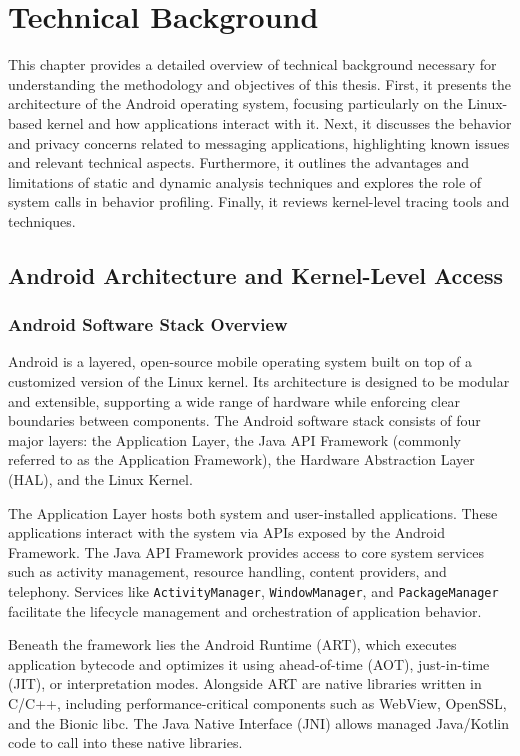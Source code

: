 \documentclass[a4paper,12pt]{report}
\begin{document}

\chapter{Technical Background}

This chapter provides a detailed overview of technical background necessary for understanding the methodology and objectives of this thesis. First, it presents the architecture of the Android operating system, focusing particularly on the Linux-based kernel and how applications interact with it. Next, it discusses the behavior and privacy concerns related to messaging applications, highlighting known issues and relevant technical aspects. Furthermore, it outlines the advantages and limitations of static and dynamic analysis techniques and explores the role of system calls in behavior profiling. Finally, it reviews kernel-level tracing tools and techniques.
\section{Android Architecture and Kernel-Level Access}

\subsection{Android Software Stack Overview}
Android is a layered, open-source mobile operating system built on top of a customized version of the
Linux kernel. Its architecture is designed to be modular and extensible, supporting a wide range of
hardware while enforcing clear boundaries between components. The Android software stack consists
of four major layers: the Application Layer, the Java API Framework (commonly referred to as the
Application Framework), the Hardware Abstraction Layer (HAL), and the Linux Kernel.

The Application Layer hosts both system and user-installed applications.
These applications interact with the system via APIs exposed by the Android Framework.
The Java API Framework provides access to core system services such as activity management,
resource handling, content providers, and telephony. Services like \texttt{ActivityManager},
\texttt{WindowManager}, and \texttt{PackageManager} facilitate the lifecycle management and
orchestration of application behavior.

Beneath the framework lies the Android Runtime (ART), which executes application bytecode and optimizes it using ahead-of-time (AOT), just-in-time (JIT), or interpretation modes. Alongside ART are native libraries written in C/C++, including performance-critical components such as WebView, OpenSSL, and the Bionic libc. The Java Native Interface (JNI) allows managed Java/Kotlin code to call into these native libraries.
\end{document}
